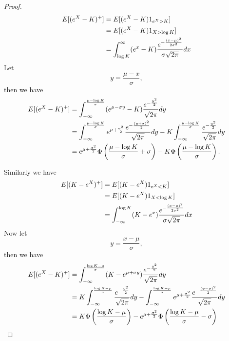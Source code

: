 \begin{proof}
\begin{align*}
  E[(e^X-K)^+] 
    &= E[ (e^X-K) 1_{e^X>K} ] \notag \\
    &= E[ (e^X-K) 1_{X>\log K} ] \notag \\
    &= \int_{\log K}^{\infty} (e^x-K) 
       \frac{e^{-\frac{(x-\mu)^2}{2\sigma^2}}}{\sigma\sqrt{2\pi}} dx \notag \\
\end{align*}
Let
\[
  y = \frac{\mu -x}{\sigma},
\]
then we have
\begin{align*}
  E[(e^X-K)^+] 
    &= \int_{-\infty}^{\frac{\mu-\log K}{\sigma}} (e^{\mu-\sigma y}-K)
         \frac{e^{-\frac{y^2}{2}}}{\sqrt{2\pi}} dy \notag \\
    &= \int_{-\infty}^{\frac{\mu-\log K}{\sigma}} e^{\mu+\frac{\sigma^2}{2}}
         \frac{e^{-\frac{(y+\sigma)^2}{2}}}{\sqrt{2\pi}} dy 
       - K \int_{-\infty}^{\frac{\mu-\log K}{\sigma}} 
         \frac{e^{-\frac{y^2}{2}}}{\sqrt{2\pi}} dy \notag \\
   &= e^{\mu+\frac{\sigma^2}{2}} 
        \Phi \left( \frac{\mu-\log{K}}{\sigma}+\sigma \right)
      -K \Phi \left( \frac{\mu-\log{K}}{\sigma} \right). \notag \\
\end{align*}

Similarly we have
\begin{align*}
  E[(K-e^X)^+] 
    &= E[ (K-e^X) 1_{e^X<K} ] \notag \\
    &= E[ (K-e^X) 1_{X<\log K} ] \notag \\
    &= \int^{\log K}_{-\infty} (K-e^x) 
       \frac{e^{-\frac{(x-\mu)^2}{2\sigma^2}}}{\sigma\sqrt{2\pi}} dx \notag \\
\end{align*}
Now let
\[
  y = \frac{x- \mu}{\sigma},
\]
then we have
\begin{align*}
  E[(e^X-K)^+] 
    &= \int_{-\infty}^{\frac{\log K-\mu}{\sigma}} (K-e^{\mu+\sigma y})
         \frac{e^{-\frac{y^2}{2}}}{\sqrt{2\pi}} dy \notag \\
    &=  K \int_{-\infty}^{\frac{\log K-\mu}{\sigma}} 
         \frac{e^{-\frac{y^2}{2}}}{\sqrt{2\pi}} dy 
        - \int_{-\infty}^{\frac{\log K-\mu}{\sigma}} e^{\mu+\frac{\sigma^2}{2}}
         \frac{e^{-\frac{(y-\sigma)^2}{2}}}{\sqrt{2\pi}} dy      \notag \\
   &= K \Phi \left( \frac{\log{K}-\mu}{\sigma} \right) 
      - e^{\mu+\frac{\sigma^2}{2}} 
        \Phi \left( \frac{\log{K}-\mu}{\sigma}-\sigma \right)     \notag \\
\end{align*}
\end{proof}
